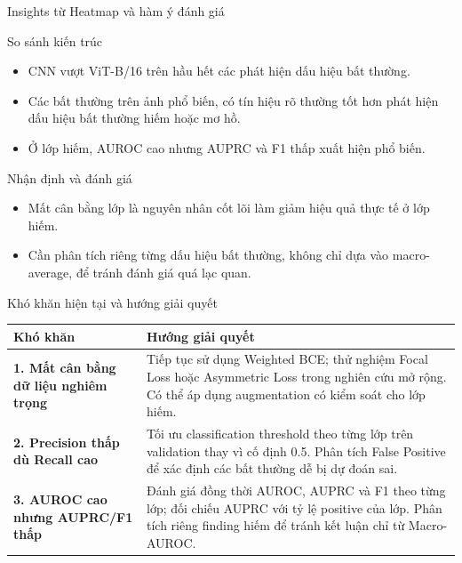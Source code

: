 \documentclass[10pt]{beamer}
\begin{document}
\begin{frame}{Insights từ Heatmap và hàm ý đánh giá}
    \begin{block}{So sánh kiến trúc}
        \small
        \begin{itemize}
            \item CNN vượt ViT-B/16 trên hầu hết các phát hiện dấu hiệu bất thường.
            \item Các bất thường trên ảnh phổ biến, có tín hiệu rõ thường tốt hơn phát hiện dấu hiệu bất thường hiếm hoặc mơ hồ.
            \item Ở lớp hiếm, AUROC cao nhưng AUPRC và F1 thấp xuất hiện phổ biến.
        \end{itemize}
    \end{block}
    \vspace{0.15cm}
    \begin{alertblock}{Nhận định và đánh giá}
        \small
        \begin{itemize}
            \item Mất cân bằng lớp là nguyên nhân cốt lõi làm giảm hiệu quả thực tế ở lớp hiếm.
            \item Cần phân tích riêng từng dấu hiệu bất thường, không chỉ dựa vào macro-average, để tránh đánh giá quá lạc quan.
        \end{itemize}
    \end{alertblock}
\end{frame}

\begin{frame}{Khó khăn hiện tại và hướng giải quyết}
    \small
    \renewcommand{\arraystretch}{1.2}
    \begin{tabularx}{\textwidth}{@{}p{}X@{}}
        \toprule
        \textbf{Khó khăn} & \textbf{Hướng giải quyết} \\
        \midrule
        \textbf{1. Mất cân bằng dữ liệu nghiêm trọng} & Tiếp tục sử dụng Weighted BCE; thử nghiệm Focal Loss hoặc Asymmetric Loss trong nghiên cứu mở rộng. Có thể áp dụng augmentation có kiểm soát cho lớp hiếm. \\
        \addlinespace[0.12cm]
        \textbf{2. Precision thấp dù Recall cao} & Tối ưu classification threshold theo từng lớp trên validation thay vì cố định 0.5. Phân tích False Positive để xác định các bất thường dễ bị dự đoán sai. \\
        \addlinespace[0.12cm]
        \textbf{3. AUROC cao nhưng AUPRC/F1 thấp} & Đánh giá đồng thời AUROC, AUPRC và F1 theo từng lớp; đối chiếu AUPRC với tỷ lệ positive của lớp. Phân tích riêng finding hiếm để tránh kết luận chỉ từ Macro-AUROC. \\
        \bottomrule
    \end{tabularx}
\end{frame}
\end{document}

